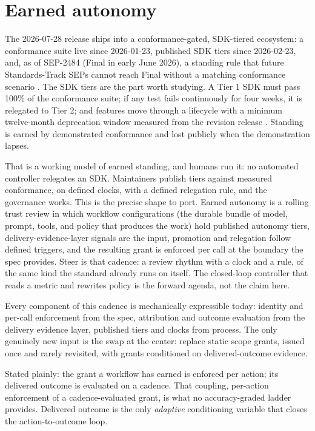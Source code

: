 \section{Earned autonomy}

The 2026-07-28 release ships into a conformance-gated, SDK-tiered ecosystem: a
conformance suite live since 2026-01-23, published SDK tiers since 2026-02-23,
and, as of SEP-2484 (Final in early June 2026), a standing rule that future
Standards-Track SEPs cannot reach Final without a matching conformance scenario
\citep{sep2484, sdktiers}. The SDK tiers are the part worth studying. A Tier 1
SDK must pass 100\% of the conformance suite; if any test fails continuously for
four weeks, it is relegated to Tier 2; and features move through a lifecycle with
a minimum twelve-month deprecation window measured from the revision release
\citep{sdktiers, mcplifecycle}. Standing is earned by demonstrated conformance
and lost publicly when the demonstration lapses.

That is a working model of earned standing, and humans run it: no automated
controller relegates an SDK. Maintainers publish tiers against measured
conformance, on defined clocks, with a defined relegation rule, and the
governance works. This is the precise shape to port. Earned autonomy is a rolling
trust review in which workflow configurations (the durable bundle of model,
prompt, tools, and policy that produces the work) hold published autonomy tiers,
delivery-evidence-layer signals are the input, promotion and relegation follow
defined triggers, and the resulting grant is enforced per call at the boundary
the spec provides. Steer is that cadence: a review rhythm with a clock and a
rule, of the same kind the standard already runs on itself. The closed-loop
controller that reads a metric and rewrites policy is the forward agenda, not the
claim here.

Every component of this cadence is mechanically expressible today: identity and
per-call enforcement from the spec, attribution and outcome evaluation from the
delivery evidence layer, published tiers and clocks from process. The only
genuinely new input is the swap at the center: replace static scope grants,
issued once and rarely revisited, with grants conditioned on delivered-outcome
evidence.

Stated plainly: the grant a workflow has earned is enforced per action; its
delivered outcome is evaluated on a cadence. That coupling, per-action
enforcement of a cadence-evaluated grant, is what no accuracy-graded ladder
provides. Delivered outcome is the only \emph{adaptive} conditioning variable
that closes the action-to-outcome loop.

